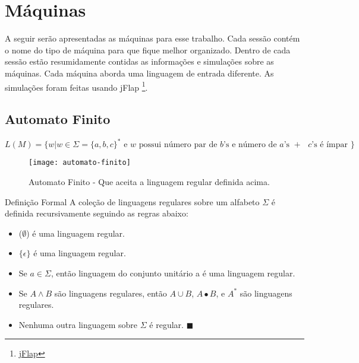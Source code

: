 \documentclass[12pt, a4paper]{article}
\begin{document}



\tableofcontents
\clearpage
\listoffigures
\clearpage



\section{Máquinas}

\qquad A seguir ser\~{a}o apresentadas as m\'{a}quinas para esse trabalho. Cada sess\~{a}o cont\'{e}m o nome do tipo de m\'{a}quina para que fique melhor organizado. Dentro de cada sess\~{a}o estão resumidamente contidas as informaç\~{o}es e simulaç\~{o}es sobre as m\'{a}quinas. Cada m\'{a}quina aborda uma linguagem de entrada diferente. As simulaç\~{o}es foram feitas usando jFlap \footnote{\href{http://www.cs.duke.edu/csed/jflap/}{jFlap}}.

\pagebreak
\subsection{Automato Finito}

$$ L(M)= \lbrace w \vert w \in \Sigma =  {\lbrace a,b,c \rbrace}^* \text{ e $w$ possui número par de $b$'s e número de $a$'s $+$ $c$'s é ímpar } \rbrace$$

\begin{figure}[ht]
  \centering
  \texttt{[image: automato-finito]}
  \caption{Automato Finito - Que aceita a linguagem regular definida acima.}
\end{figure}

\qquad Definição Formal
A coleção de linguagens regulares sobre um alfabeto $\Sigma$ é definida recursivamente seguindo as regras abaixo:

\begin{itemize}
  \item ($\emptyset$) é uma linguagem regular.
  \item $\lbrace \epsilon \rbrace$ é uma linguagem regular.
  \item Se $ a \in \Sigma$, então linguagem do conjunto unitário a é uma linguagem regular.
  \item Se $A \wedge B$ são linguagens regulares, então $A \cup B$, $A \bullet B$, e ${A}^*$ são linguagens regulares.
  \item Nenhuma outra linguagem sobre $\Sigma$ é regular. $\blacksquare$
\end{itemize}
\end{document}
